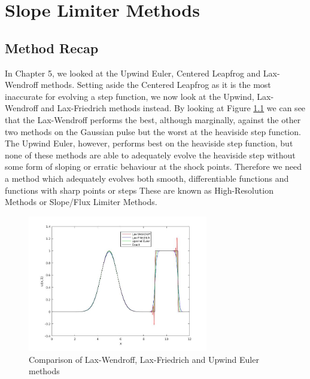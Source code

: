 \chapter{Slope Limiter Methods}
\section{Method Recap}
In Chapter 5, we looked at the Upwind Euler, Centered Leapfrog and Lax-Wendroff methods. Setting aside the Centered Leapfrog as it is the most inaccurate for evolving a step function, we now look at the Upwind, Lax-Wendroff and Lax-Friedrich methods instead. By looking at Figure \ref{fig:lw_lf_ue} we can see that the Lax-Wendroff performs the best, although marginally, against the other two methods on the Gaussian pulse but the worst at the heaviside step function. The Upwind Euler, however, performs best on the heaviside step function, but none of these methods are able to adequately evolve the heaviside step without some form of sloping or erratic behaviour at the shock points. Therefore we need a method which adequately evolves both smooth, differentiable functions and functions with sharp points or steps These are known as High-Resolution Methods or Slope/Flux Limiter Methods.
\begin{figure}[H]
  \centering
  \includegraphics[width=0.7\textwidth]{Images/7_lw_lf_ue.jpg}
  \caption{Comparison of Lax-Wendroff, Lax-Friedrich and Upwind Euler methods}\label{fig:lw_lf_ue}
\end{figure}
